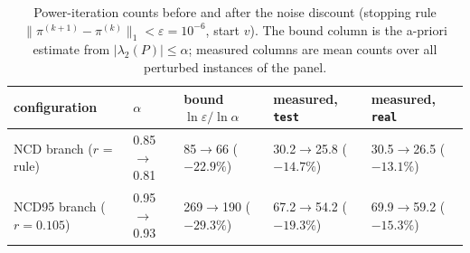 \begin{table}[t]
\centering
\small
\caption{Power-iteration counts before and after the noise discount (stopping rule $\|\pi^{(k+1)}-\pi^{(k)}\|_1<\varepsilon=10^{-6}$, start $v$). The bound column is the a-priori estimate from $|\lambda_2(P)|\le\alpha$; measured columns are mean counts over all perturbed instances of the panel.}
\label{tab:conv}
\begin{tabular}{@{}lllll@{}}
\toprule
configuration & $\alpha$ & bound $\ln\varepsilon/\ln\alpha$ & measured, \texttt{test} & measured, \texttt{real} \\
\midrule
NCD branch ($r$ = rule) & 0.85$\to$0.81 & 85$\to$66 ($-22.9\%$) & 30.2$\to$25.8 ($-14.7\%$) & 30.5$\to$26.5 ($-13.1\%$) \\
NCD95 branch ($r=0.105$) & 0.95$\to$0.93 & 269$\to$190 ($-29.3\%$) & 67.2$\to$54.2 ($-19.3\%$) & 69.9$\to$59.2 ($-15.3\%$) \\
\bottomrule
\end{tabular}
\end{table}
